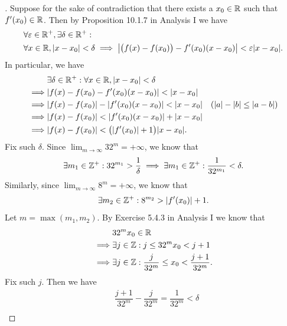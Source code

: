 \begin{proof}[]
  Suppose for the sake of contradiction that there exists a \(x_0 \in \mathbb{R}\) such that \(f'(x_0) \in \mathbb{R}\).
  Then by Proposition 10.1.7 in Analysis I we have
  \begin{align*}
     & \forall \varepsilon \in \R^+, \exists \delta \in \R^+ :                                                                          \\
     & \forall x \in \R, \abs{x - x_0} < \delta \implies \abs{\big(f(x) - f(x_0)\big) - f'(x_0) (x - x_0)} < \varepsilon \abs{x - x_0}.
  \end{align*}
  In particular, we have
  \begin{align*}
             & \exists \delta \in \R^+ : \forall x \in \R, \abs{x - x_0} < \delta                                        \\
    \implies & \abs{f(x) - f(x_0) - f'(x_0) (x - x_0)} < \abs{x - x_0}                                                   \\
    \implies & \abs{f(x) - f(x_0)} - \abs{f'(x_0) (x - x_0)} < \abs{x - x_0}      & (\abs{a} - \abs{b} \leq \abs{a - b}) \\
    \implies & \abs{f(x) - f(x_0)} < \abs{f'(x_0) (x - x_0)} + \abs{x - x_0}                                             \\
    \implies & \abs{f(x) - f(x_0)} < \big(\abs{f'(x_0)} + 1\big) \abs{x - x_0}.
  \end{align*}
  Fix such \(\delta\).
  Since \(\lim_{m \to \infty} 32^m = +\infty\), we know that
  \[
    \exists m_1 \in \mathbb{Z}^+ : 32^{m_1} > \dfrac{1}{\delta} \implies \exists m_1 \in \mathbb{Z}^+ : \dfrac{1}{32^{m_1}} < \delta.
  \]
  Similarly, since \(\lim_{m \to \infty} 8^m = +\infty\), we know that
  \[
    \exists m_2 \in \mathbb{Z}^+ : 8^{m_2} > \left\lvert f'(x_0)\right\rvert + 1.
  \]
  Let \(m = \max(m_1, m_2)\).
  By Exercise 5.4.3 in Analysis I we know that
  \begin{align*}
             & 32^m x_0 \in \mathbb{R}                                                    \\
    \implies & \exists j \in \mathbb{Z} : j \leq 32^m x_0 < j + 1                         \\
    \implies & \exists j \in \mathbb{Z} : \dfrac{j}{32^m} \leq x_0 < \dfrac{j + 1}{32^m}.
  \end{align*}
  Fix such \(j\).
  Then we have
  \begin{align*}
             & \dfrac{j + 1}{32^m} - \dfrac{j}{32^m} = \dfrac{1}{32^m} < \delta                                                                                    \\

\end{align*}
\end{proof}

